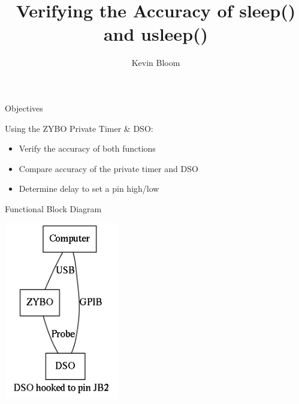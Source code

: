 \documentclass[pdf]{beamer}
\title{Verifying the Accuracy of sleep() and usleep()}
\author{Kevin Bloom}
\begin{document}

\begin{frame}

  \titlepage

\end{frame}


\begin{frame}{Objectives}


  Using the ZYBO Private Timer \& DSO:
  \pause
  \begin{itemize}

  \item Verify the accuracy of both functions

    \pause

  \item Compare accuracy of the private timer and DSO

    \pause

  \item Determine delay to set a pin high/low

  \end{itemize}


\end{frame}

\begin{frame}{Functional Block Diagram}

  \centering
  \includegraphics[width=50mm]{block-diagram.png}

\end{frame}
\end{document}
